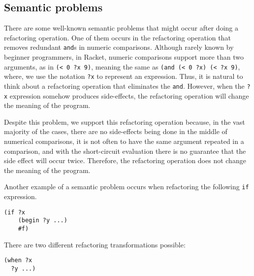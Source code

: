 \subsection{Semantic problems}
There are some well-known semantic problems that might occur after
doing a refactoring operation.  One of them occurs in the refactoring
operation that removes redundant {\tt and}s in numeric comparisons.
Although rarely known by beginner programmers, in Racket, numeric
comparisons support more than two arguments, as in \verb|(< 0 ?x 9)|,
meaning the same as %
\verb|(and (< 0 ?x) (< ?x 9)|, where, we use the notation \verb|?x| to
represent an expression. Thus, it is natural to think about a
refactoring operation that eliminates the \verb|and|.  However, when
the \verb|?x| expression somehow produces side-effects, the
refactoring operation will change the meaning of the program.



Despite this problem, we support this refactoring operation because,
in the vast majority of the cases, there are no side-effects being
done in the middle of numerical comparisons, it is not often to have the same
argument repeated in a comparison, and with the short-circuit evaluation there
is no guarantee that the side effect will occur twice.
Therefore, the refactoring operation does not change the meaning of the program.


Another example of a semantic problem occurs when refactoring the following {\tt if}
expression.
\begin{lstlisting}[basicstyle=\ttfamily, caption=Code sample]
(if ?x
    (begin ?y ...)
    #f)
\end{lstlisting}
There are two different refactoring transformations possible:
\begin{lstlisting}[basicstyle=\ttfamily, caption=Refactoring option 1]
(when ?x
  ?y ...)
\end{lstlisting}

